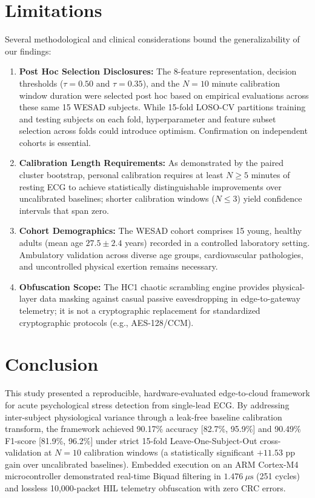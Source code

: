 \documentclass[preprint,12pt,3p]{elsarticle}
\begin{document}
\section{Limitations}
\label{sec:limitations}
Several methodological and clinical considerations bound the generalizability of our findings:
\begin{enumerate}
    \item \textbf{Post Hoc Selection Disclosures:} The 8-feature representation, decision thresholds ($\tau=0.50$ and $\tau=0.35$), and the $N=10$ minute calibration window duration were selected post hoc based on empirical evaluations across these same 15 WESAD subjects. While 15-fold LOSO-CV partitions training and testing subjects on each fold, hyperparameter and feature subset selection across folds could introduce optimism. Confirmation on independent cohorts is essential.
    \item \textbf{Calibration Length Requirements:} As demonstrated by the paired cluster bootstrap, personal calibration requires at least $N \ge 5$ minutes of resting ECG to achieve statistically distinguishable improvements over uncalibrated baselines; shorter calibration windows ($N \le 3$) yield confidence intervals that span zero.
    \item \textbf{Cohort Demographics:} The WESAD cohort comprises 15 young, healthy adults (mean age $27.5 \pm 2.4$ years) recorded in a controlled laboratory setting. Ambulatory validation across diverse age groups, cardiovascular pathologies, and uncontrolled physical exertion remains necessary.
    \item \textbf{Obfuscation Scope:} The HC1 chaotic scrambling engine provides physical-layer data masking against casual passive eavesdropping in edge-to-gateway telemetry; it is not a cryptographic replacement for standardized cryptographic protocols (e.g., AES-128/CCM).
\end{enumerate}

\section{Conclusion}
This study presented a reproducible, hardware-evaluated edge-to-cloud framework for acute psychological stress detection from single-lead ECG. By addressing inter-subject physiological variance through a leak-free baseline calibration transform, the framework achieved 90.17\% accuracy [82.7\%, 95.9\%] and 90.49\% F1-score [81.9\%, 96.2\%] under strict 15-fold Leave-One-Subject-Out cross-validation at $N=10$ calibration windows (a statistically significant $+11.53\text{ pp}$ gain over uncalibrated baselines). Embedded execution on an ARM Cortex-M4 microcontroller demonstrated real-time Biquad filtering in $1.476~\mu\text{s}$ (251 cycles) and lossless 10,000-packet HIL telemetry obfuscation with zero CRC errors.
\end{document}
